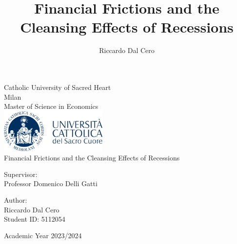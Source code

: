 \documentclass[12pt]{report}
\title{Financial Frictions and the Cleansing Effects of Recessions}
\author{Riccardo Dal Cero}
\begin{document}
\begin{titlepage}
    \centering

    \Large Catholic University of Sacred Heart\\
    \large Milan\\
    \Large Master of Science in Economics\\
    \vspace{2cm}
    \includegraphics[width=0.4\textwidth]{logo.png}\\ 
    \vspace{2cm}
    \Huge Financial Frictions and the Cleansing Effects of Recessions\\

    \vspace{2cm}

    \begin{flushleft}
    \large Supervisor: \\ Professor Domenico Delli Gatti
    \end{flushleft}
    
    \vfill
    
    \hfill
    \begin{minipage}{0.5\textwidth}
        \raggedleft
        \large Author:\\
        \large Riccardo Dal Cero\\
        \large Student ID: 5112054
    \end{minipage}
    
    \vspace{0.8cm}

    \Large{Academic Year 2023/2024}
    
\end{titlepage}
\end{document}
